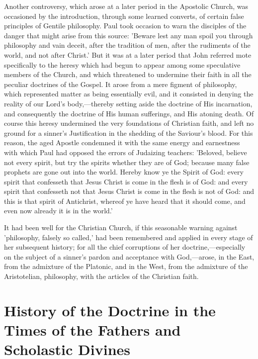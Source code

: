 \documentclass[
]{book}
\begin{document}
Another controversy, which arose at a later period in the Apostolic Church, was occasioned by the introduction, through some learned converts, of certain false principles of Gentile philosophy. Paul took occasion to warn the disciples of the danger that might arise from this source: 'Beware lest any man spoil you through philosophy and vain deceit, after the tradition of men, after the rudiments of the world, and not after Christ.' But it was at a later period that John referred mote specifically to the heresy which had begun to appear among some speculative members of the Church, and which threatened to undermine their faith in all the peculiar doctrines of the Gospel. It arose from a mere figment of philosophy, which represented matter as being essentially evil, and it consisted in denying the reality of our Lord's body,---thereby setting aside the doctrine of His incarnation, and consequently the doctrine of His human sufferings, and His atoning death. Of course this heresy undermined the very foundations of Christian faith, and left no ground for a sinner's Justification in the shedding of the Saviour's blood. For this reason, the aged Apostle condemned it with the same energy and earnestness with which Paul had opposed the errors of Judaizing teachers: 'Beloved, believe not every spirit, but try the spirits whether they are of God; because many false prophets are gone out into the world. Hereby know ye the Spirit of God: every spirit that confesseth that Jesus Christ is come in the flesh is of God: and every spirit that confesseth not that Jesus Christ is come in the flesh is not of God: and this is that spirit of Antichrist, whereof ye have heard that it should come, and even now already it is in the world.'

It had been well for the Christian Church, if this seasonable warning against 'philosophy, falsely so called,' had been remembered and applied in every stage of her subsequent history; for all the chief corruptions of her doctrine,---especially on the subject of a sinner's pardon and acceptance with God,---arose, in the East, from the admixture of the Platonic, and in the West, from the admixture of the Aristotelian, philosophy, with the articles of the Christian faith.

\hypertarget{history-of-the-doctrine-in-the-times-of-the-fathers-and-scholastic-divines}{%
\chapter{History of the Doctrine in the Times of the Fathers and Scholastic Divines}\label{history-of-the-doctrine-in-the-times-of-the-fathers-and-scholastic-divines}}
\end{document}
